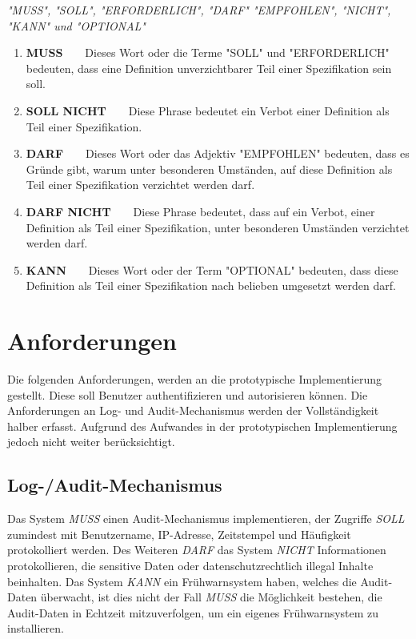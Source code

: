 \documentclass[11pt,a4paper]{report}
\begin{document}
\begin{center}
\textit{"MUSS", "SOLL", "ERFORDERLICH", "DARF" "EMPFOHLEN", "NICHT", "KANN" und "OPTIONAL"}
\end{center} 

\begin{enumerate}
\item \textbf{MUSS}~~~~Dieses Wort oder die Terme "SOLL" und "ERFORDERLICH" bedeuten, dass eine  Definition unverzichtbarer Teil einer Spezifikation sein soll.
\item \textbf{SOLL NICHT}~~~~Diese Phrase bedeutet ein Verbot einer Definition als Teil einer Spezifikation.
\item \textbf{DARF}~~~~Dieses Wort oder das Adjektiv "EMPFOHLEN" bedeuten, dass es  Gründe gibt, warum unter besonderen Umständen, auf diese Definition als Teil einer Spezifikation verzichtet werden darf. 
\item \textbf{DARF NICHT}~~~~Diese Phrase bedeutet, dass auf ein Verbot, einer Definition als Teil einer Spezifikation, unter besonderen Umständen verzichtet werden darf.
\item \textbf{KANN}~~~~Dieses Wort oder der Term "OPTIONAL" bedeuten, dass diese Definition als Teil einer Spezifikation nach belieben umgesetzt werden darf.
\end{enumerate}

\section{Anforderungen}

Die folgenden Anforderungen, werden an die prototypische Implementierung gestellt. Diese soll Benutzer authentifizieren und autorisieren können. Die Anforderungen an Log- und Audit-Mechanismus werden der Vollständigkeit halber erfasst. Aufgrund des Aufwandes in der prototypischen Implementierung jedoch nicht weiter berücksichtigt.

\subsection{Log-/Audit-Mechanismus}

Das System \textit{MUSS} einen Audit-Mechanismus implementieren, der Zugriffe \textit{SOLL} zumindest mit Benutzername, IP-Adresse, Zeitstempel und Häufigkeit protokolliert werden. Des Weiteren \textit{DARF} das System \textit{NICHT} Informationen protokollieren, die sensitive Daten oder datenschutzrechtlich illegal Inhalte beinhalten. Das System \textit{KANN} ein Frühwarnsystem haben, welches die Audit-Daten überwacht, ist dies nicht der Fall \textit{MUSS} die Möglichkeit bestehen, die Audit-Daten in Echtzeit mitzuverfolgen, um ein eigenes Frühwarnsystem zu installieren.
\end{document}

